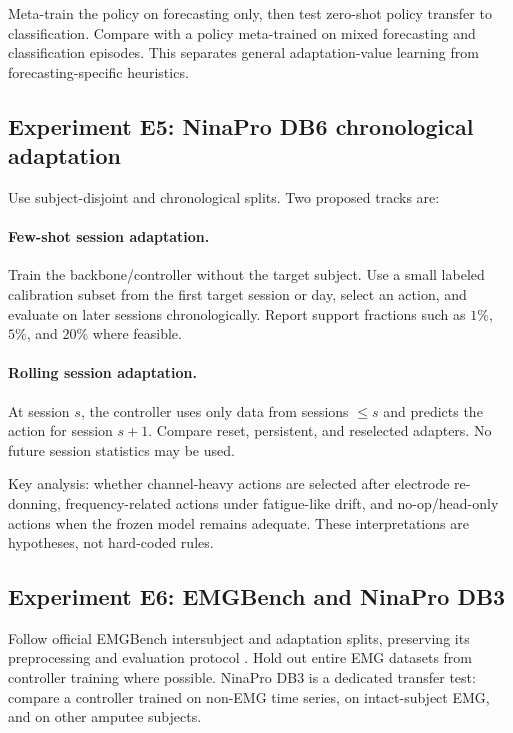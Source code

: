 \documentclass[10pt]{article}
\begin{document}
Meta-train the policy on forecasting only, then test zero-shot policy transfer to classification. Compare with a policy meta-trained on mixed forecasting and classification episodes. This separates general adaptation-value learning from forecasting-specific heuristics.

\subsection{Experiment E5: NinaPro DB6 chronological adaptation}

Use subject-disjoint and chronological splits. Two proposed tracks are:

\paragraph{Few-shot session adaptation.} Train the backbone/controller without the target subject. Use a small labeled calibration subset from the first target session or day, select an action, and evaluate on later sessions chronologically. Report support fractions such as $1\%$, $5\%$, and $20\%$ where feasible.

\paragraph{Rolling session adaptation.} At session $s$, the controller uses only data from sessions $\le s$ and predicts the action for session $s+1$. Compare reset, persistent, and reselected adapters. No future session statistics may be used.

Key analysis: whether channel-heavy actions are selected after electrode re-donning, frequency-related actions under fatigue-like drift, and no-op/head-only actions when the frozen model remains adequate. These interpretations are hypotheses, not hard-coded rules.

\subsection{Experiment E6: EMGBench and NinaPro DB3}

Follow official EMGBench intersubject and adaptation splits, preserving its preprocessing and evaluation protocol \citep{yang2024emgbench}. Hold out entire EMG datasets from controller training where possible. NinaPro DB3 is a dedicated transfer test: compare a controller trained on non-EMG time series, on intact-subject EMG, and on other amputee subjects.
\end{document}
